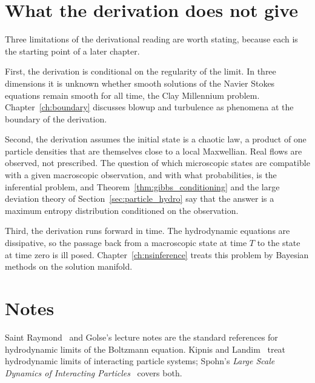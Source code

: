 \section{What the derivation does not give}

Three limitations of the derivational reading are worth stating, because each is the starting point of a later chapter.

First, the derivation is conditional on the regularity of the limit. In three dimensions it is unknown whether smooth solutions of the Navier Stokes equations remain smooth for all time, the Clay Millennium problem. Chapter~\ref{ch:boundary} discusses blowup and turbulence as phenomena at the boundary of the derivation.

Second, the derivation assumes the initial state is a chaotic law, a product of one particle densities that are themselves close to a local Maxwellian. Real flows are observed, not prescribed. The question of which microscopic states are compatible with a given macroscopic observation, and with what probabilities, is the inferential problem, and Theorem~\ref{thm:gibbs_conditioning} and the large deviation theory of Section~\ref{sec:particle_hydro} say that the answer is a maximum entropy distribution conditioned on the observation.

Third, the derivation runs forward in time. The hydrodynamic equations are dissipative, so the passage back from a macroscopic state at time $T$ to the state at time zero is ill posed. Chapter~\ref{ch:nsinference} treats this problem by Bayesian methods on the solution manifold.



\section*{Notes}

Saint Raymond~\cite{saintraymond2009} and Golse's lecture notes are the standard references for hydrodynamic limits of the Boltzmann equation. Kipnis and Landim~\cite{kipnislandim1999} treat hydrodynamic limits of interacting particle systems; Spohn's \emph{Large Scale Dynamics of Interacting Particles}~\cite{spohn1991} covers both.
